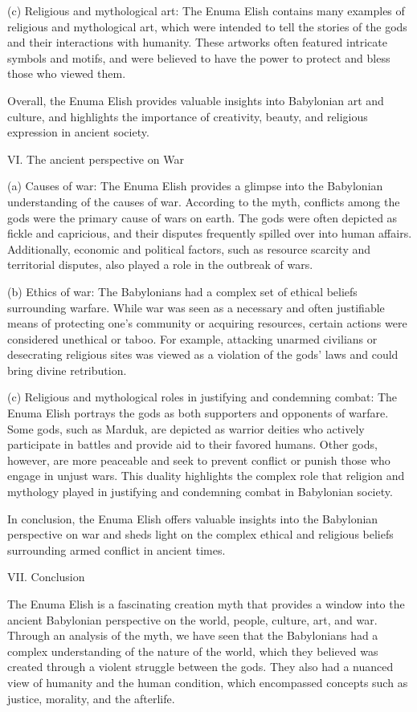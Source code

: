 \documentclass[12pt,a4paper,english]{article}
\begin{document}
(c) Religious and mythological art: The Enuma Elish contains many examples of religious and mythological art, which were intended to tell the stories of the gods and their interactions with humanity. 
These artworks often featured intricate symbols and motifs, and were believed to have the power to protect and bless those who viewed them.

Overall, the Enuma Elish provides valuable insights into Babylonian art and culture, and highlights the importance of creativity, beauty, and religious expression in ancient society.

VI. The ancient perspective on War

(a) Causes of war: The Enuma Elish provides a glimpse into the Babylonian understanding of the causes of war. 
According to the myth, conflicts among the gods were the primary cause of wars on earth. 
The gods were often depicted as fickle and capricious, and their disputes frequently spilled over into human affairs. 
Additionally, economic and political factors, such as resource scarcity and territorial disputes, also played a role in the outbreak of wars.

(b) Ethics of war: The Babylonians had a complex set of ethical beliefs surrounding warfare. 
While war was seen as a necessary and often justifiable means of protecting one's community or acquiring resources, certain actions were considered unethical or taboo. 
For example, attacking unarmed civilians or desecrating religious sites was viewed as a violation of the gods' laws and could bring divine retribution.

(c) Religious and mythological roles in justifying and condemning combat: The Enuma Elish portrays the gods as both supporters and opponents of warfare. 
Some gods, such as Marduk, are depicted as warrior deities who actively participate in battles and provide aid to their favored humans. 
Other gods, however, are more peaceable and seek to prevent conflict or punish those who engage in unjust wars. 
This duality highlights the complex role that religion and mythology played in justifying and condemning combat in Babylonian society.

In conclusion, the Enuma Elish offers valuable insights into the Babylonian perspective on war and sheds light on the complex ethical and religious beliefs surrounding armed conflict in ancient times.

VII. Conclusion

The Enuma Elish is a fascinating creation myth that provides a window into the ancient Babylonian perspective on the world, people, culture, art, and war. 
Through an analysis of the myth, we have seen that the Babylonians had a complex understanding of the nature of the world, which they believed was created through a violent struggle between the gods. 
They also had a nuanced view of humanity and the human condition, which encompassed concepts such as justice, morality, and the afterlife.
\end{document}

